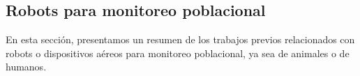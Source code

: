 \subsection{Robots para monitoreo poblacional} %
\label{sub:RobotsparaMonitoreoPoblacional}
    En esta secci\'on, presentamos un resumen de los trabajos previos relacionados con robots o dispositivos a\'ereos 
        para monitoreo poblacional, ya sea de animales o de humanos. 
    
    
    
